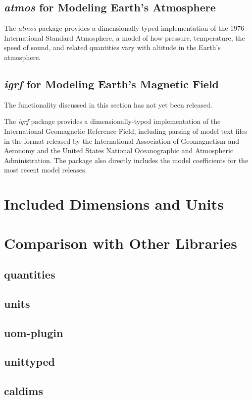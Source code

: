\documentclass[11pt]{report}
\newcommand{\packagename}[1]{\textit{#1}}
\newcommand{\prerelease}{\begin{framed}
The functionality discussed in this section has not yet been released.
\end{framed}}
\begin{document}
\section{\packagename{atmos} for Modeling Earth's Atmosphere}

The \packagename{atmos} package provides a dimensionally-typed implementation of the 1976 International Standard
Atmosphere, a model of how pressure, temperature, the speed of sound, and related quantities vary with
altitude in the Earth's atmosphere.

\section{\packagename{igrf} for Modeling Earth's Magnetic Field}

\prerelease{}

The \packagename{igrf} package provides a dimensionally-typed implementation of the International Geomagnetic
Reference Field, including parsing of model text files in the format released by the International Association of
Geomagnetism and Aeronomy and the United States National Oceanographic and Atmospheric Administration. The
package also directly includes the model coefficients for the most recent model releases.

\chapter{Included Dimensions and Units}

\chapter{Comparison with Other Libraries}

\section{quantities}
\section{units}
\section{uom-plugin}
\section{unittyped}
\section{caldims}
\end{document}

